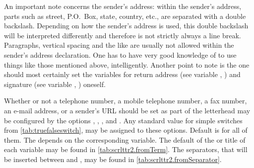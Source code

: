 An important note concerns the sender's address: within
the sender's address, parts such as street, P.O.~Box, state, country, etc.,
are separated with a double backslash. Depending on how the sender's address
is used, this double backslash will be interpreted differently and therefore
is not strictly always a line break. Paragraphs, vertical spacing and the like
are usually not allowed within the sender's address declaration. One has to
have very good knowledge of  to use things like those
mentioned above, intelligently. Another point to note is the one should most
certainly set the variables for return address (see variable
, ) and
signature (see variable ,
) oneself.%
%
\EndIndexGroup


\begin{Declaration}
\end{Declaration}%
%
%
Whether or not a telephone number, a
mobile telephone number, a fax number, an
e-mail address, or a sender's URL should be set as part of the
letterhead may be configured by the options ,
, , and . Any standard value
for simple switches from \autoref{tab:truefalseswitch},
 may be assigned to these options. Default is
 for all of them. The  depends on the
corresponding variable. The default of the  or title of
each variable may be found in \autoref{tab:scrlttr2.fromTerm}. The separators,
that will be inserted between  and , may be
found in \autoref{tab:scrlttr2.fromSeparator}.

